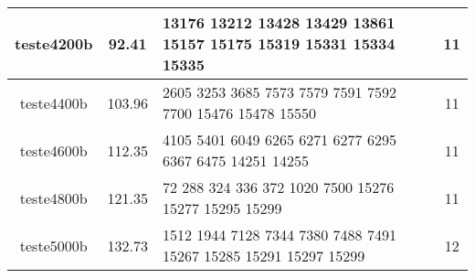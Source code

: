 \documentclass[12pt]{article}
\begin{document}
\begin{table}[h]
\begin{tabular}{c | c || p{8cm} | c}
  \hline
  teste4200b & 92.41 & 13176 13212 13428 13429 13861 15157 15175 15319 15331 15334 15335 & 11 \\
  \hline
  teste4400b & 103.96 & 2605 3253 3685 7573 7579 7591 7592 7700 15476 15478 15550 & 11 \\
  \hline
  teste4600b & 112.35 & 4105 5401 6049 6265 6271 6277 6295 6367 6475 14251 14255 & 11 \\
  \hline
  teste4800b & 121.35 & 72 288 324 336 372 1020 7500 15276 15277 15295 15299 & 11 \\
  \hline
  teste5000b & 132.73 & 1512 1944 7128 7344 7380 7488 7491 15267 15285 15291 15297 15299 & 12
\end{tabular}
\end{table}
\end{document}
